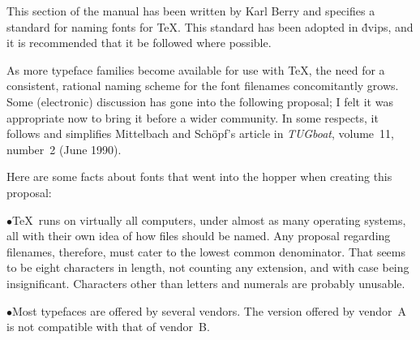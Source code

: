{\def\journal#1{{\sl #1}}
\def\table{\vbox\bgroup
\vskip\parskip\halign\bgroup\strut\indent\tt ##\hfil\quad
    &\vtop{%
       \advance\hsize by -\parindent %
       \advance\hsize by -1em	     %
       \advance\hsize by -2\fontdimen7\tentt
       \rm\noindent ##}\hfil
    \cr}
\def\setuphsize{%
       \advance\hsize by -\parindent %
       \divide\hsize by 2	     %
       \advance\hsize by -1.5em      %
       \advance\hsize by -2\fontdimen7\tentt}
\def\dtable{\vbox\bgroup\vskip\parskip\halign\bgroup\strut
    \indent##&\tt ##\hfil\quad
    &\vtop{\setuphsize\rm\noindent ##}\hfil&\quad\tt ##\hfil\quad
    &\vtop{\setuphsize\rm\noindent ##}\hfil\cr}
\def\endtable{%
  \egroup\egroup %
  \smallskip %
}
\def\entry#1#2{#1&#2\cr}
\def\mitem{\item{$\bullet$}}
\def\\{\hfil\break}

This section of the manual has been written by Karl Berry and
specifies a standard for naming fonts for \TeX.  This standard has
been adopted in \.{dvips}, and it is recommended that it be followed
where possible.

As more typeface families become available for use with \TeX, the need
for a consistent, rational naming scheme for the font filenames
concomitantly grows. Some (electronic) discussion has gone into the
following proposal; I felt it was appropriate now to bring it before a
wider community.  In some respects, it follows and simplifies
Mittelbach and Sch\"opf's article in \journal{TUGboat}, volume~11,
number~2 (June 1990).

Here are some facts about fonts that went into the hopper when creating
this proposal:

\mitem \TeX\ runs on virtually all computers, under almost as many operating
systems, all with their own idea of how files should be named.	Any
proposal regarding filenames, therefore, must cater to the lowest common
denominator.  That seems to be eight characters in length, not counting any
extension, and with case being insignificant.  Characters other
than letters and numerals are probably unusable.

\mitem Most typefaces are offered by several vendors.  The version
offered by vendor~A is not compatible with that of vendor~B.

}
